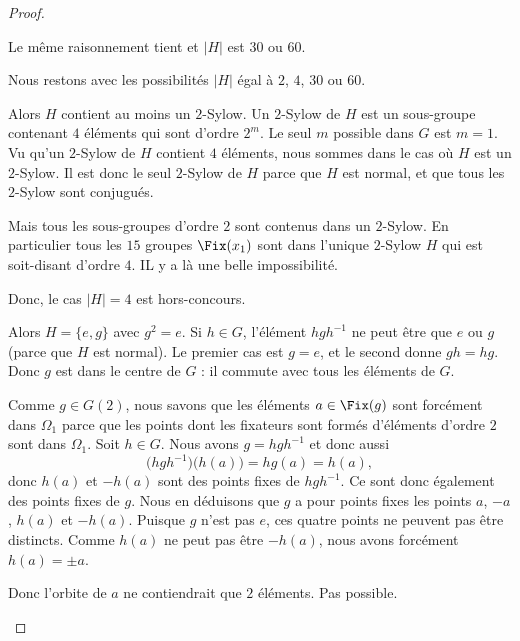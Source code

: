 \begin{proof}
\begin{subproof}
		Le même raisonnement tient et \( | H |\) est \( 30\) ou \( 60\).
	\end{subproof}

	Nous restons avec les possibilités \( | H |\) égal à \( 2\), \( 4\), \( 30\) ou \( 60\).

	\begin{subproof}
		\spitem[Si \( | H | = 4\)]

		Alors \( H\) contient au moins un \( 2\)-Sylow. Un \( 2\)-Sylow de \( H\) est un sous-groupe contenant \( 4\) éléments qui sont d'ordre \( 2^m\). Le seul \( m\) possible dans \( G\) est \( m=1\). Vu qu'un \( 2\)-Sylow de \( H\) contient \( 4\) éléments, nous sommes dans le cas où \( H\) est un \( 2\)-Sylow. Il est donc le seul \( 2\)-Sylow de \( H\) parce que \( H\) est normal, et que tous les \( 2\)-Sylow sont conjugués.

		Mais tous les sous-groupes d'ordre \( 2\) sont contenus dans un \( 2\)-Sylow. En particulier tous les \( 15\) groupes \( \Fix(x_1)\) sont dans l'unique \( 2\)-Sylow \( H\) qui est soit-disant d'ordre \( 4\). IL y a là une belle impossibilité.

		Donc, le cas \( | H |=4\) est hors-concours.

		\spitem[Si \( | H |=2\)]
		Alors \( H=\{ e,g \}\) avec \( g^2=e\). Si \( h\in G\), l'élément \( hgh^{-1}\) ne peut être que \( e\) ou \( g\) (parce que \( H\) est normal). Le premier cas est \( g=e\), et le second donne \( gh=hg\). Donc \( g\) est dans le centre de \( G\) : il commute avec tous les éléments de \( G\).

		Comme \( g\in G(2)\), nous savons que les éléments \( a\in\Fix(g)\) sont forcément dans \( \Omega_1\) parce que les points dont les fixateurs sont formés d'éléments d'ordre \( 2\) sont dans \( \Omega_1\). Soit \( h\in G\). Nous avons \( g=hgh^{-1}\) et donc aussi
		\begin{equation}
			\big( hgh^{-1} \big)\big( h(a) \big)=hg(a)=h(a),
		\end{equation}
		donc \( h(a)\) et \( -h(a)\) sont des points fixes de \( hgh^{-1}\). Ce sont donc également des points fixes de \( g\). Nous en déduisons que \( g\) a pour points fixes les points \( a\), \( -a\), \( h(a)\) et \( -h(a)\). Puisque \( g\) n'est pas \( e\), ces quatre points ne peuvent pas être distincts. Comme \( h(a)\) ne peut pas être \( -h(a)\), nous avons forcément \( h(a)=\pm a\).

		Donc l'orbite de \( a\) ne contiendrait que \( 2\) éléments. Pas possible.


\end{subproof}
\end{proof}
